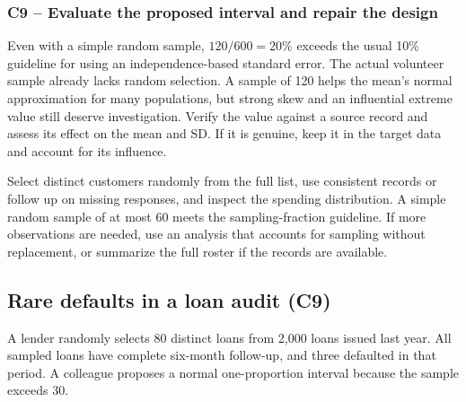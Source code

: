 
	\label{sol:c9-1-b}
	\subsubsection*{C9 -- Evaluate the proposed interval and repair the design}

	Even with a simple random sample, $120/600=20\%$ exceeds the usual 10\% guideline for using an independence-based standard error. The actual volunteer sample already lacks random selection. A sample of 120 helps the mean's normal approximation for many populations, but strong skew and an influential extreme value still deserve investigation. Verify the value against a source record and assess its effect on the mean and SD. If it is genuine, keep it in the target data and account for its influence.

	Select distinct customers randomly from the full list, use consistent records or follow up on missing responses, and inspect the spending distribution. A simple random sample of at most 60 meets the sampling-fraction guideline. If more observations are needed, use an analysis that accounts for sampling without replacement, or summarize the full roster if the records are available.


	\clearpage

	\subsection{Rare defaults in a loan audit (C9)}
	\label{prob:c9-2}

	A lender randomly selects 80 distinct loans from 2,000 loans issued last year. All sampled loans have complete six-month follow-up, and three defaulted in that period. A colleague proposes a normal one-proportion interval because the sample exceeds 30.


	\label{sol:c9-2-a}
